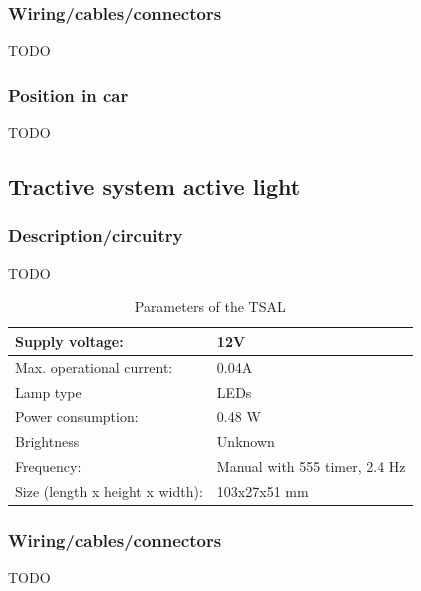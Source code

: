 \documentclass{article}
\begin{document}
\subsubsection{Wiring/cables/connectors}
TODO

\subsubsection{Position in car}
TODO

\subsection{Tractive system active light}
\subsubsection{Description/circuitry}
TODO

	\begin{table}[H]
	    \centering
	    \begin{tabular}{|l|l|}
	    \hline
	    Supply voltage: & 12V \\ \hline
	    Max. operational current: &  0.04A\\ \hline
	    Lamp type & LEDs \\ \hline
	    Power consumption: & 0.48 W\\ \hline
	    Brightness & Unknown\\ \hline
	    Frequency: & Manual with 555 timer, 2.4 Hz \\ \hline
	    Size (length x height x width): & 103x27x51 mm \\ \hline
	    \end{tabular}
	    \caption{Parameters of the TSAL}
	    \label{TSALparameters}
	\end{table}

\subsubsection{Wiring/cables/connectors}
TODO
\end{document}
